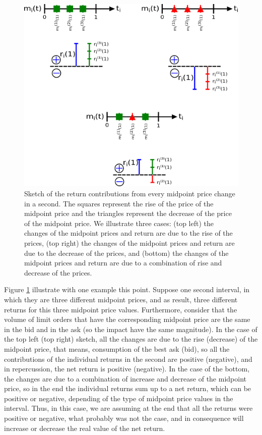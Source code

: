 \begin{figure}[htbp]
    \centering
    \includegraphics[width=\columnwidth]{figures/02_return_contributions.png}
    \caption{Sketch of the return contributions from every midpoint price
             change in a second. The squares represent the rise of the price of
             the midpoint price and the triangles represent the decrease of the
             price of the midpoint price. We illustrate three cases: (top left)
             the changes of the midpoint prices and return are due to the rise
             of the prices, (top right) the changes of the midpoint prices and
             return are due to the decrease of the prices, and (bottom) the
             changes of the midpoint prices and return are due to a combination
             of rise and decrease of the prices.}
    \label{fig:return_contributions}
\end{figure}

Figure \ref{fig:return_contributions} illustrate with one example this point.
Suppose one second interval, in which they are three different midpoint prices,
and as result, three different returns for this three midpoint price
values. Furthermore, consider that the volume of limit orders that have the
corresponding midpoint price are the same in the bid and in the ask (so the
impact have the same magnitude). In the case of the top left (top right)
sketch, all the changes are due to the rise (decrease) of the midpoint price,
that means, consumption of the best ask (bid), so all the contributions of the
individual returns in the second are positive (negative), and in repercussion,
the net return is positive (negative). In the case of the bottom, the changes
are due to a combination of increase and decrease of the midpoint price, so in
the end the individual returns sum up to a net return, which can be positive or
negative, depending of the type of midpoint price values in the interval. Thus,
in this case, we are assuming at the end that all the returns were positive or
negative, what probably was not the case, and in consequence will increase or
decrease the real value of the net return.

